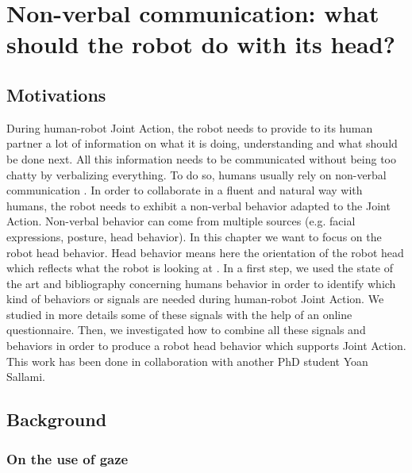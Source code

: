 \documentclass[english,a4paper,11pt,twoside]{StyleThese}
\begin{document}
\setcounter{chapter}{5} %
\dominitoc
\faketableofcontents
\fi

\chapter{Non-verbal communication: what should the robot do with its head?}
\minitoc

\label{ch:Acting}

\section{Motivations}

During human-robot Joint Action, the robot needs to provide to its human partner a lot of information on what it is doing, 
understanding and what should be done next. All this information needs to be communicated without being too chatty by verbalizing everything. To do so, humans usually rely on non-verbal communication \cite{ekman1969repertoire, depaulo1992nonverbal}. In order to collaborate in a fluent and natural way with humans, the robot needs to exhibit a non-verbal behavior adapted to the Joint Action. Non-verbal behavior can come from multiple sources (e.g. facial expressions, posture, head behavior). In this chapter we want to focus on the robot head behavior. Head behavior means here the orientation of the robot head which reflects what the robot is looking at \cite{imai2002robot}. In a first step, we used the state of the art and bibliography concerning humans behavior in order to identify which kind of behaviors or signals are needed during human-robot Joint Action. We studied in more details some of these signals with the help of an online questionnaire. Then, we investigated how to combine all these signals and behaviors in order to produce a robot head behavior which supports Joint Action. This work has been done in collaboration with another PhD student Yoan Sallami.


\section{Background}

\subsection{On the use of gaze}
\end{document}
